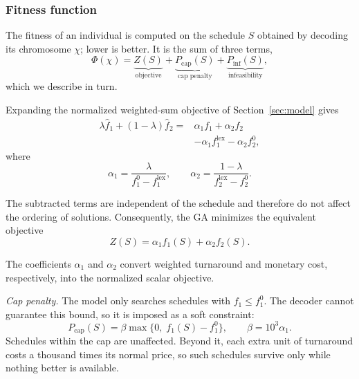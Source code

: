 \documentclass[conference]{IEEEtran}
\begin{document}
\subsubsection{Fitness function}
The fitness of an individual is computed on the schedule $S$ obtained by decoding its chromosome $\chi$; lower is better. It is the sum of three terms,
\begin{equation}
 \Phi(\chi)=\underbrace{Z(S)}_{\text{objective}}
 +\underbrace{P_{\mathrm{cap}}(S)}_{\text{cap penalty}}
 +\underbrace{P_{\mathrm{inf}}(S)}_{\text{infeasibility}},
 \label{eq:fitness}
\end{equation}
which we describe in turn.

Expanding the normalized weighted-sum objective of
Section~\ref{sec:model} gives
\begin{equation}
\begin{aligned}
\lambda\widehat f_1+(1-\lambda)\widehat f_2
={}&\alpha_1f_1+\alpha_2f_2\\
&-\alpha_1f_1^{\mathrm{lex}}-\alpha_2f_2^0,
\end{aligned}
\end{equation}
where
\begin{equation}
\label{eq:ga-weights}
\alpha_1=
\frac{\lambda}{f_1^0-f_1^{\mathrm{lex}}},
\qquad
\alpha_2=
\frac{1-\lambda}{f_2^{\mathrm{lex}}-f_2^0}.
\end{equation}

The subtracted terms are independent of the schedule
and therefore do not affect the ordering of solutions.
Consequently, the GA minimizes the equivalent objective
\begin{equation}
\label{eq:ga-objective}
Z(S)=\alpha_1f_1(S)+\alpha_2f_2(S).
\end{equation}

The coefficients $\alpha_1$ and $\alpha_2$ convert
weighted turnaround and monetary cost, respectively,
into the normalized scalar objective.

\emph{Cap penalty.} The model only searches schedules with $f_1\leq f_1^0$. The decoder cannot guarantee this bound, so it is imposed as a soft constraint:
\begin{equation}
 P_{\mathrm{cap}}(S)=\beta\max\bigl\{0,\;f_1(S)-f_1^0\bigr\},\qquad \beta=10^3\alpha_1.
\end{equation}
Schedules within the cap are unaffected. Beyond it, each extra unit of turnaround costs a thousand times its normal price, so such schedules survive only while nothing better is available.
\end{document}
